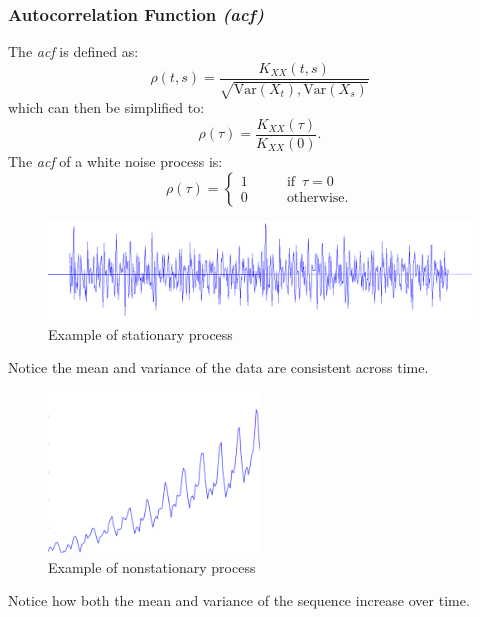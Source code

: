 \documentclass{article}
\begin{document}
\subsubsection{Autocorrelation Function \emph{(acf)}}
The \emph{acf} is defined as:
\begin{equation}\label{acf}
    \rho(t, s) = \frac{K_{XX}(t, s)}{\sqrt{\text{Var}(X_t), \text{Var}(X_s)}}\nonumber
\end{equation}
which can then be simplified to:
\begin{equation}\label{acf}
    \rho(\tau) = \frac{K_{XX}(\tau)}{K_{XX}(0)}.
\end{equation}
The \emph{acf} of a white noise process is:
\begin{equation}
    \rho(\tau) = \begin{cases}
        1\qquad &\text{if } \, \tau=0\\
        0 \qquad &\text{otherwise.}
    \end{cases}\nonumber
\end{equation}
\begin{figure}[H]
    \centering
    \includegraphics[width=\textwidth]{Stationary.png}
    \caption{Example of stationary process}
    \label{stationary}
\end{figure}
Notice the mean and variance of the data are consistent across time.
\begin{figure}[H]
    \centering
    \includegraphics[width=0.5\textwidth]{nonstationary.png}
    \caption{Example of nonstationary process}
    \label{nonstatinoary}
\end{figure}
Notice how both the mean and variance of the sequence increase over time.
\end{document}
